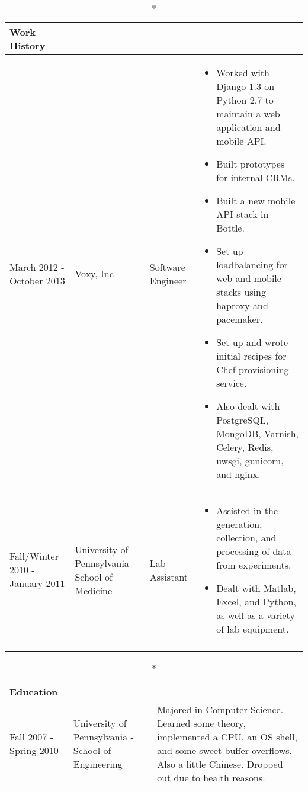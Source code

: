 \documentclass[a4paper]{article}
\begin{document}
    \vspace{.2in}
    \begin{longtable}{ m{3cm} m{3cm} m{3cm} m{8cm}}
        \caption*{Work History}\\
        \hline
        March 2012 - \newline October 2013 & Voxy, Inc & Software Engineer & 
            \begin{itemize}
                \item Worked with Django 1.3 on Python 2.7 to maintain a web application and mobile API.
                \item Built prototypes for internal CRMs.
                \item Built a new mobile API stack in Bottle.
                \item Set up loadbalancing for web and mobile stacks using haproxy and pacemaker.
                \item Set up and wrote initial recipes for Chef provisioning service.
                \item Also dealt with PostgreSQL, MongoDB, Varnish, Celery, Redis, uwsgi, gunicorn, and nginx. 
            \end{itemize}
        \\
        \hline
        Fall/Winter 2010 - January 2011 & University of \newline Pennsylvania - \newline School of Medicine & Lab Assistant & 
            \begin{itemize}
                \item Assisted in the generation, collection, and processing of data from experiments. 
                \item Dealt with Matlab, Excel, and Python, as well as a variety of lab equipment.
            \end{itemize}
        \\
        \hline
        \par
    \end{longtable}

    \begin{longtable}{ m{3cm} m{6.45cm} m{8cm} }
        \caption*{Education}\\
        \hline
        Fall 2007 - \newline Spring 2010 & University of \newline Pennsylvania - \newline School of Engineering & Majored in Computer Science. Learned some theory, implemented a CPU, an OS shell, and some sweet buffer overflows. Also a little Chinese. Dropped out due to health reasons. \\
    \end{longtable}
    \vspace{.3in}
    
\end{document}
